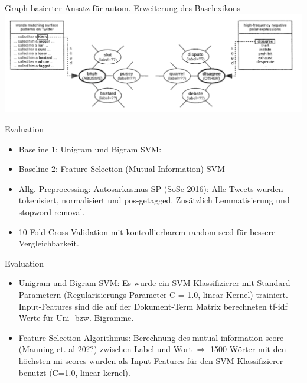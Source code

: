 \documentclass{beamer}
\begin{document}
\begin{frame}[plain, t]
{Graph-basierter Ansatz für autom. Erweiterung des Baselexikons}
\includegraphics[width=\textwidth,height=0.95\textheight,keepaspectratio]{graph.png}
\end{frame}


\begin{frame}{Evaluation}
\begin{itemize}
\item Baseline 1: Unigram und Bigram SVM: 
\item Baseline 2: Feature Selection (Mutual Information) SVM 
\item Allg. Preprocessing: Autosarkasmus-SP (SoSe 2016): Alle Tweets wurden tokenisiert, normalisiert und pos-getagged. Zusätzlich Lemmatisierung und stopword removal.
\item 10-Fold Cross Validation mit kontrollierbarem random-seed für bessere Vergleichbarkeit.
\end{itemize}
\end{frame}

\begin{frame}{Evaluation}
\begin{itemize}
\item Unigram und Bigram SVM: Es wurde ein SVM Klassifizierer mit Standard-Parametern (Regularisierungs-Parameter C = 1.0, linear Kernel) trainiert. Input-Features sind die auf der Dokument-Term Matrix berechneten tf-idf Werte für Uni- bzw. Bigramme.  
\item Feature Selection Algorithmus: Berechnung des mutual information score (Manning et. al 20??) zwischen Label und Wort $\Rightarrow$ 1500 Wörter mit den höchsten mi-scores wurden als Input-Features für den SVM Klassifizierer benutzt (C=1.0, linear-kernel). 
\end{itemize}
\end{frame}
\end{document}
